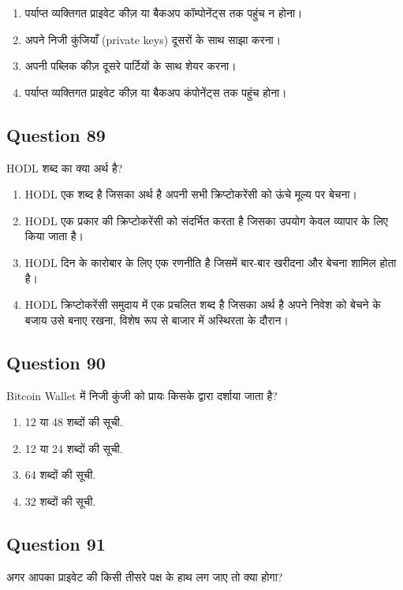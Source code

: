\documentclass[12pt,a4paper]{article}
\begin{document}
\begin{enumerate}[label=\Alph*., leftmargin=*]
\item पर्याप्त व्यक्तिगत प्राइवेट कीज़ या बैकअप कॉम्पोनेंट्स तक पहुंच न होना।
\item अपने निजी कुंजियाँ (private keys) दूसरों के साथ साझा करना।
\item अपनी पब्लिक कीज़ दूसरे पार्टियों के साथ शेयर करना।
\item पर्याप्त व्यक्तिगत प्राइवेट कीज़ या बैकअप कंपोनेंट्स तक पहुंच होना।
\end{enumerate}

\bigskip


\subsection*{Question 89}
HODL शब्द का क्या अर्थ है?

\begin{enumerate}[label=\Alph*., leftmargin=*]
\item HODL एक शब्द है जिसका अर्थ है अपनी सभी क्रिप्टोकरेंसी को ऊंचे मूल्य पर बेचना।
\item HODL एक प्रकार की क्रिप्टोकरेंसी को संदर्भित करता है जिसका उपयोग केवल व्यापार के लिए किया जाता है।
\item HODL दिन के कारोबार के लिए एक रणनीति है जिसमें बार-बार खरीदना और बेचना शामिल होता है।
\item HODL क्रिप्टोकरेंसी समुदाय में एक प्रचलित शब्द है जिसका अर्थ है अपने निवेश को बेचने के बजाय उसे बनाए रखना, विशेष रूप से बाजार में अस्थिरता के दौरान।
\end{enumerate}

\bigskip


\subsection*{Question 90}
Bitcoin Wallet में निजी कुंजी को प्रायः किसके द्वारा दर्शाया जाता है?

\begin{enumerate}[label=\Alph*., leftmargin=*]
\item 12 या 48 शब्दों की सूची.
\item 12 या 24 शब्दों की सूची.
\item 64 शब्दों की सूची.
\item 32 शब्दों की सूची.
\end{enumerate}

\bigskip


\subsection*{Question 91}
अगर आपका प्राइवेट की किसी तीसरे पक्ष के हाथ लग जाए तो क्या होगा?
\end{document}
